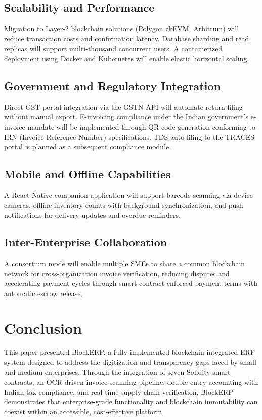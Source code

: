 \documentclass[conference]{IEEEtran}
\begin{document}
\subsection{Scalability and Performance}
Migration to Layer-2 blockchain solutions (Polygon zkEVM, Arbitrum) will reduce transaction costs and confirmation latency. Database sharding and read replicas will support multi-thousand concurrent users. A containerized deployment using Docker and Kubernetes will enable elastic horizontal scaling.

\subsection{Government and Regulatory Integration}
Direct GST portal integration via the GSTN API will automate return filing without manual export. E-invoicing compliance under the Indian government's e-invoice mandate will be implemented through QR code generation conforming to IRN (Invoice Reference Number) specifications. TDS auto-filing to the TRACES portal is planned as a subsequent compliance module.

\subsection{Mobile and Offline Capabilities}
A React Native companion application will support barcode scanning via device cameras, offline inventory counts with background synchronization, and push notifications for delivery updates and overdue reminders.

\subsection{Inter-Enterprise Collaboration}
A consortium mode will enable multiple SMEs to share a common blockchain network for cross-organization invoice verification, reducing disputes and accelerating payment cycles through smart contract-enforced payment terms with automatic escrow release.

\section{Conclusion}

This paper presented BlockERP, a fully implemented blockchain-integrated ERP system designed to address the digitization and transparency gaps faced by small and medium enterprises. Through the integration of seven Solidity smart contracts, an OCR-driven invoice scanning pipeline, double-entry accounting with Indian tax compliance, and real-time supply chain verification, BlockERP demonstrates that enterprise-grade functionality and blockchain immutability can coexist within an accessible, cost-effective platform.
\end{document}
